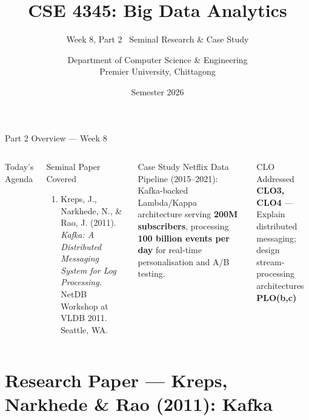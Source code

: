 \documentclass[aspectratio=169,10pt]{beamer}
\title[CSE 4345 \textbar{} Week 8, Part 2]{CSE 4345: Big Data Analytics}
\subtitle{Week 8, Part 2 \textemdash\ Seminal Research \& Case Study}
\author[Dept.\ of CSE]{Department of Computer Science \& Engineering\\[4pt]
       \small Premier University, Chittagong}
\institute{}
\date{Semester 2026}
\begin{document}

\begin{frame}
  \titlepage
\end{frame}

\begin{frame}{Part 2 Overview — Week 8}
  \begin{columns}[T]
      \begin{block}{Today's Agenda}
        \tableofcontents
      \end{block}

      \begin{exampleblock}{Seminal Paper Covered}
        \begin{enumerate}
          \item Kreps, J., Narkhede, N., \& Rao, J. (2011).
                \textit{Kafka: A Distributed Messaging System
                for Log Processing.}
                NetDB Workshop at VLDB 2011.
                Seattle, WA.
        \end{enumerate}
      \end{exampleblock}
      \vspace{6pt}
      \begin{alertblock}{Case Study}
        Netflix Data Pipeline (2015--2021):
        Kafka-backed Lambda/Kappa architecture serving
        \textbf{200M subscribers}, processing
        \textbf{100 billion events per day} for real-time
        personalisation and A/B testing.
      \end{alertblock}
      \vspace{4pt}
      \begin{block}{CLO Addressed}
        \textbf{CLO3, CLO4} — Explain distributed messaging;
        design stream-processing architectures\\
        \textbf{PLO(b,c)}
      \end{block}
  \end{columns}
\end{frame}

\section{Research Paper — Kreps, Narkhede \& Rao (2011): Kafka}
\end{document}
